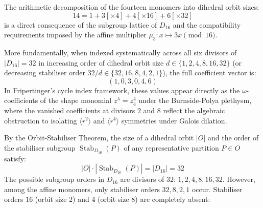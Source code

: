 The arithmetic decomposition of the fourteen monomers into dihedral orbit sizes:
\[
14 = 1 + 3[\times 4] + 4[\times 16] + 6[\times 32]
\]
is a direct consequence of the subgroup lattice of $D_{16}$ and the compatibility requirements imposed by the affine multiplier $\mu_3 \colon x \mapsto 3x \pmod{16}$.

More fundamentally, when indexed systematically across all six divisors of $|D_{16}| = 32$ in increasing order of dihedral orbit size $d \in \{1, 2, 4, 8, 16, 32\}$ (or decreasing stabiliser order $32/d \in \{32, 16, 8, 4, 2, 1\}$), the full coefficient vector is:
\[
(1, 0, 3, 0, 4, 6)
\]
In Fripertinger's cycle index framework, these values appear directly as the $\omega$-coefficients of the shape monomial $z^\lambda = z_4^4$ under the Burnside-Polya plethysm, where the vanished coefficients at divisors $2$ and $8$ reflect the algebraic obstruction to isolating $\langle r^2 \rangle$ and $\langle r^4 \rangle$ symmetries under Galois dilation.

By the Orbit-Stabiliser Theorem, the size of a dihedral orbit $|O|$ and the order of the stabiliser subgroup $\operatorname{Stab}_{D_{16}}(P)$ of any representative partition $P \in O$ satisfy:
\[
|O| \cdot |\operatorname{Stab}_{D_{16}}(P)| = |D_{16}| = 32
\]
The possible subgroup orders in $D_{16}$ are divisors of $32$: $1, 2, 4, 8, 16, 32$. However, among the affine monomers, only stabiliser orders $32, 8, 2, 1$ occur. Stabiliser orders $16$ (orbit size $2$) and $4$ (orbit size $8$) are completely absent:

